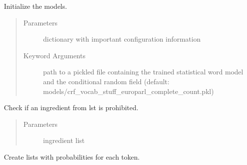 \documentclass[letterpaper,10pt,english]{sphinxmanual}
\begin{document}
\begin{fulllineitems}
\begin{fulllineitems}
\end{fulllineitems}


\begin{fulllineitems}
\label{\detokenize{api:ingredient_extractor.IngredientExtractor.__init__}}
Initialize the models.
\begin{quote}\begin{description}
\item[{Parameters}] \leavevmode
{} \textendash{} dictionary with important configuration information

\item[{Keyword Arguments}] \leavevmode
{} \textendash{} path to a pickled file containing the trained
statistical word model and the conditional random field
(default: models/crf\_vocab\_stuff\_europarl\_complete\_count.pkl)

\end{description}\end{quote}

\end{fulllineitems}


\begin{fulllineitems}
\label{\detokenize{api:ingredient_extractor.IngredientExtractor.blacklist_check}}
Check if an ingredient from lst is prohibited.
\begin{quote}\begin{description}
\item[{Parameters}] \leavevmode
{} \textendash{} ingredient list

\end{description}\end{quote}

\end{fulllineitems}


\begin{fulllineitems}
\label{\detokenize{api:ingredient_extractor.IngredientExtractor.create_feat_lists}}
Create lists with probabilities for each token.


\end{fulllineitems}
\end{fulllineitems}
\end{document}
